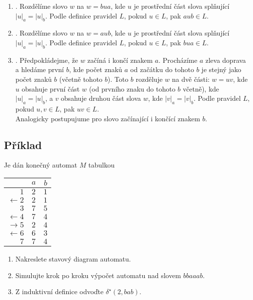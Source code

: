 \begin{enumerate}[label={}]
    \item {}. Rozdělíme slovo $w$ na $w = bua$, kde $u$ je prostřední část slova splňující
    $|u|_a = |u|_b$. Podle definice pravidel $L$, pokud $u \in L$, pak $aub \in L$.
    \item {}. Rozdělíme slovo $w$ na $w = aub$, kde $u$ je prostřední část slova splňující
    $|u|_a = |u|_b$. Podle definice pravidel $L$, pokud $u \in L$, pak $bua \in L$.
    \item {}. Předpokládejme, že $w$ začíná i končí znakem $a$. Procházíme $a$ zleva
    doprava a hledáme první $b$, kde počet znaků $a$ od začátku do tohoto $b$ je stejný jako počet znaků $b$ (včetně
    tohoto $b$). Toto $b$ rozděluje $w$ na dvě části: $w = uv$, kde $u$ obsahuje první část $w$ (od prvního znaku do
    tohoto $b$ včetně), kde $|u|_a = |u|_b$, a $v$ obsahuje druhou část slova $w$, kde $|v|_a = |v|_b$. Podle pravidel
    $L$, pokud $u, v \in L$, pak $uv \in L$. \\
    Analogicky postupujume pro slovo začínající i končící znakem $b$.
\end{enumerate}

\newpage
\subsection{Příklad}
Je dán konečný automat $M$ tabulkou

\begin{multicols}{2}

\begin{tabular}{|r|c|c|}
    \hline
    & $a$ & $b$\\
    \hline
    \hline
    $1$            & $2$   & $1$\\
    $\leftarrow 2$ & $2$   & $1$\\
    $3$            & $7$   & $5$\\
    $\leftarrow 4$ & $7$   & $4$\\
    $\rightarrow 5$& $2$   & $4$\\
    $\leftarrow 6$ & $6$   & $3$\\
    $ 7$           & $7$   & $4$\\
    \hline
\end{tabular}

\columnbreak

\begin{enumerate}[noitemsep]
    \item Nakreslete stavový diagram automatu.
    \item Simulujte krok po kroku výpočet automatu nad slovem $bbaaab$.
    \item Z induktivní definice odvoďte $\delta^\star(2, bab)$.
\end{enumerate}

\end{multicols}


